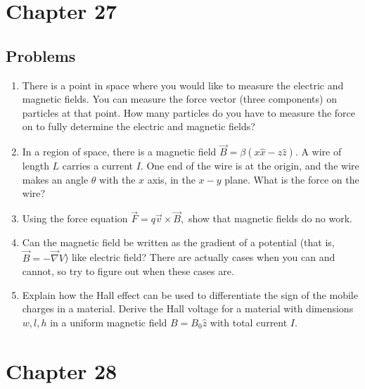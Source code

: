 \documentclass[12pt]{book}
\begin{document}
\section{Chapter 27}

\subsection{Problems}
\begin{enumerate}
\item There is a point in space where you would like to measure the electric and magnetic fields. You can measure the force vector (three components) on particles at that point. How many particles do you have to measure the force on to fully determine the electric and magnetic fields?
 \item In a region of space, there is a magnetic field $\vec{B} = \beta( x \hat{x} - z \hat{z}).$ A wire of length $L$ carries a current $I.$ One end of the wire is at the origin, and the wire makes an angle $\theta$ with the $x$ axis, in the $x-y$ plane. What is the force on the wire?
 \item Using the force equation $\vec{F} = q \vec{v}\times\vec{B},$ show that magnetic fields do no work.
 \item Can the magnetic field be written as the gradient of a potential (that is, $\vec{B} = -\vec{\nabla}V$) like electric field? There are actually cases when you can and cannot, so try to figure out when these cases are.
 \item Explain how the Hall effect can be used to differentiate the sign of the mobile charges in a material. Derive the Hall voltage for a material with dimensions $w, l, h$
in a uniform magnetic field $B = B_0 \hat{z}$ with total current $I.$

\end{enumerate}

\pagebreak


\section{Chapter 28}
\end{document}
